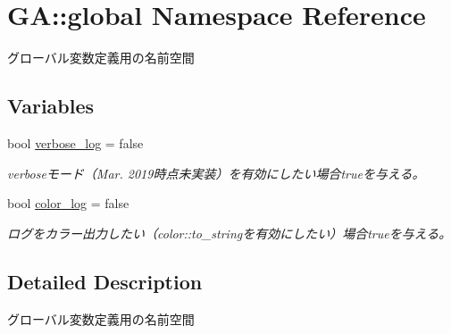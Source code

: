 \hypertarget{namespace_g_a_1_1global}{}\section{GA\+::global Namespace Reference}
\label{namespace_g_a_1_1global}


グローバル変数定義用の名前空間  


\subsection*{Variables}
\begin{DoxyCompactItemize}
\item 
\mbox{\label{namespace_g_a_1_1global_a503304ec81b99e760c6aea73e752b9ea}} 
bool \mbox{\hyperlink{namespace_g_a_1_1global_a503304ec81b99e760c6aea73e752b9ea}{verbose\+\_\+log}} = false
\begin{DoxyCompactList}\small\item\em verboseモード（\+Mar. 2019時点未実装）を有効にしたい場合trueを与える。 \end{DoxyCompactList}\item 
\mbox{\label{namespace_g_a_1_1global_a2e9c3ac13444e92eff7f5925ca7e8d58}} 
bool \mbox{\hyperlink{namespace_g_a_1_1global_a2e9c3ac13444e92eff7f5925ca7e8d58}{color\+\_\+log}} = false
\begin{DoxyCompactList}\small\item\em ログをカラー出力したい（color\+::to\+\_\+stringを有効にしたい）場合trueを与える。 \end{DoxyCompactList}\end{DoxyCompactItemize}


\subsection{Detailed Description}
グローバル変数定義用の名前空間 

